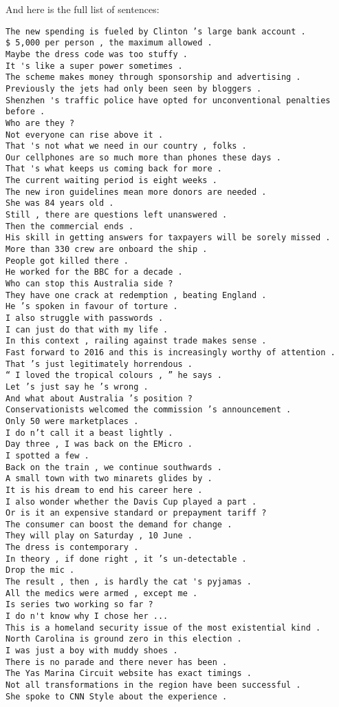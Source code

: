 And here is the full list of sentences:
\begin{verbatim}
The new spending is fueled by Clinton ’s large bank account .
$ 5,000 per person , the maximum allowed .
Maybe the dress code was too stuffy .
It 's like a super power sometimes .
The scheme makes money through sponsorship and advertising .
Previously the jets had only been seen by bloggers .
Shenzhen 's traffic police have opted for unconventional penalties before .
Who are they ?     
Not everyone can rise above it .
That 's not what we need in our country , folks .
Our cellphones are so much more than phones these days .
That 's what keeps us coming back for more .
The current waiting period is eight weeks .
The new iron guidelines mean more donors are needed .
She was 84 years old .
Still , there are questions left unanswered .
Then the commercial ends .
His skill in getting answers for taxpayers will be sorely missed .
More than 330 crew are onboard the ship .
People got killed there .
He worked for the BBC for a decade .
Who can stop this Australia side ?
They have one crack at redemption , beating England .
He ’s spoken in favour of torture .
I also struggle with passwords .
I can just do that with my life .
In this context , railing against trade makes sense .
Fast forward to 2016 and this is increasingly worthy of attention .
That ’s just legitimately horrendous .
“ I loved the tropical colours , ” he says .
Let ’s just say he ’s wrong .
And what about Australia ’s position ?
Conservationists welcomed the commission ’s announcement .
Only 50 were marketplaces .
I do n’t call it a beast lightly .
Day three , I was back on the EMicro .
I spotted a few .  
Back on the train , we continue southwards .
A small town with two minarets glides by .
It is his dream to end his career here .
I also wonder whether the Davis Cup played a part .
Or is it an expensive standard or prepayment tariff ?
The consumer can boost the demand for change .
They will play on Saturday , 10 June .
The dress is contemporary .
In theory , if done right , it ’s un-detectable .
Drop the mic .     
The result , then , is hardly the cat 's pyjamas .
All the medics were armed , except me .
Is series two working so far ?
I do n't know why I chose her ...
This is a homeland security issue of the most existential kind .
North Carolina is ground zero in this election .
I was just a boy with muddy shoes .
There is no parade and there never has been .
The Yas Marina Circuit website has exact timings .
Not all transformations in the region have been successful .
She spoke to CNN Style about the experience .

\end{verbatim}
